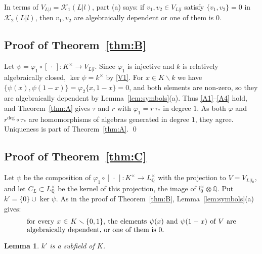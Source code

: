 \documentclass[11pt]{amsart}
\newtheorem{lemma}[theorem]{Lemma}
\theoremstyle{definition}
\theoremstyle{remark}
\newcommand{\QQ}{\mathbb{Q}}
\newcommand{\sm}{\smallsetminus}
\newcommand{\Kr}{\mathcal{K}}
\begin{document}
In terms of $V_{L|l}=\Kr_1(L|l)$, part (a) says: if $v_1,v_2\in V_{L|l}$ satisfy $\{v_1,v_2\}=0$ in $\Kr_2(L|l)$, then $v_1,v_2$ are algebraically dependent or one of them is $0$.

\subsection{Proof of Theorem~\ref{thm:B}}
Let $\psi=\varphi_1\circ[\,\cdot\,]\colon K^\times\to V_{L|l}$. Since $\varphi_1$ is injective and $k$ is relatively algebraically closed, $\ker\psi=k^\times$ by \ref{V1}.
For $x\in K\sm k$ we have $\{\psi(x),\psi(1-x)\}=\varphi_2\{x,1-x\}=0$, and both elements are non-zero, so they are algebraically dependent by Lemma~\ref{lem:symbols}(a). Thus \ref{A1}--\ref{A4} hold, and Theorem~\ref{thm:A} gives
$\tau$ and $r$ with $\varphi_1=r\,\tau_*$ in degree $1$. As both $\varphi$ and $r^{\deg}\circ\tau_*$ are homomorphisms of algebras generated in degree $1$, they agree. Uniqueness is part of Theorem~\ref{thm:A}. \qed

\subsection{Proof of Theorem~\ref{thm:C}}
Let $\psi$ be the composition of $\varphi_1\circ[\,\cdot\,]\colon K^\times\to L^\times_\QQ$ with the projection to $V=V_{L|l_0}$, and let $C_L\subset L^\times_\QQ$ be the kernel of this projection, the image of $l_0^\times\otimes\QQ$.
Put $k'=\{0\}\cup\ker\psi$. As in the proof of Theorem~\ref{thm:B}, Lemma~\ref{lem:symbols}(a) gives:
\begin{equation}\label{eq:dep}
\begin{minipage}{0.86\textwidth}
for every $x\in K\sm\{0,1\}$, the elements $\psi(x)$ and $\psi(1-x)$ of $V$ are algebraically dependent, or one of them is $0$.
\end{minipage}
\end{equation}

\begin{lemma}\label{lem:kprime}
$k'$ is a subfield of $K$.
\end{lemma}
\end{document}

